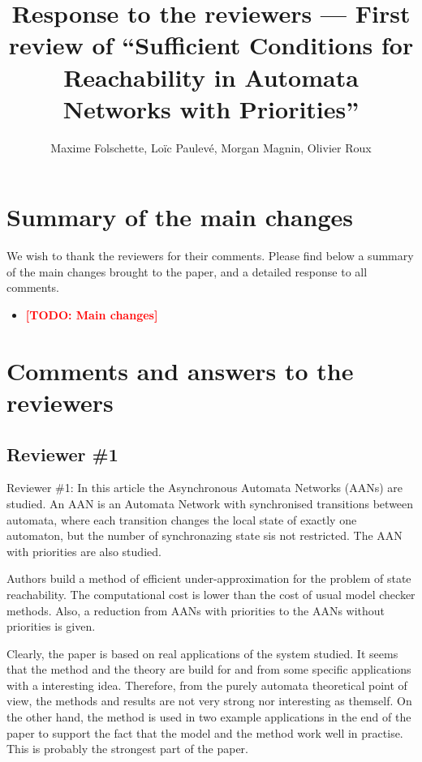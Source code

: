 \documentclass[11pt]{article}
\title{Response to the reviewers --- First review of “Sufficient Conditions for Reachability in Automata Networks with Priorities”}
\author{Maxime Folschette, Loïc Paulevé, Morgan Magnin, Olivier Roux}
\date{}
\newcommand{\todo}[1]{\textcolor{red}{\textbf{[TODO: #1]}}}
\begin{document}
\maketitle



\section*{Summary of the main changes}

We wish to thank the reviewers for their comments.
Please find below a summary of the main changes brought to the paper, and a detailed response to all comments.

\begin{itemize}
  \item \todo{Main changes}
\end{itemize}



\section*{Comments and answers to the reviewers}

\subsection*{Reviewer \#1}


Reviewer \#1: In this article the  Asynchronous Automata Networks (AANs) are studied. An AAN is an Automata Network with synchronised transitions between automata, where each transition changes the local state of exactly one automaton, but the number of synchronazing state sis not restricted.  The AAN with priorities are also studied. 

Authors build a method of efficient under-approximation for the problem of state reachability. The computational cost is lower than the cost of usual model checker methods. Also, a reduction from AANs with priorities to the AANs without priorities is given.

Clearly, the paper is based on real applications of the system studied. It seems that the method and the theory are build for and from some specific applications with a interesting idea. Therefore, from the purely automata theoretical point of view,  the methods and results are not very strong nor interesting as themself. On the other hand, the method is used in two example applications in the end of the paper to support the fact that the model and the method work well in practise. This is probably the strongest part of the paper.  
\end{document}
